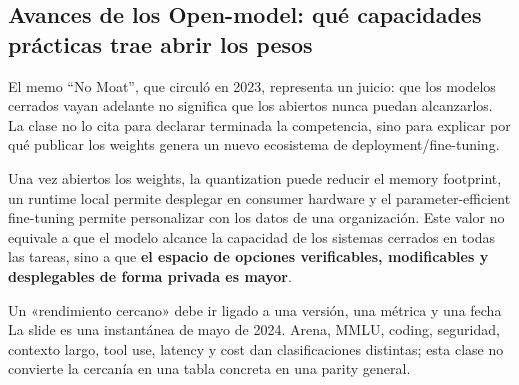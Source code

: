 
\subsection{Avances de los Open-model: qué capacidades prácticas trae abrir los pesos}

El memo ``No Moat'', que circuló en 2023, representa un juicio: que los modelos cerrados vayan adelante no significa que los abiertos nunca puedan alcanzarlos. La clase no lo cita para declarar terminada la competencia, sino para explicar por qué publicar los weights genera un nuevo ecosistema de deployment/fine-tuning.


Una vez abiertos los weights, la quantization puede reducir el memory footprint, un runtime local permite desplegar en consumer hardware y el parameter-efficient fine-tuning permite personalizar con los datos de una organización. Este valor no equivale a que el modelo alcance la capacidad de los sistemas cerrados en todas las tareas, sino a que \textbf{el espacio de opciones verificables, modificables y desplegables de forma privada es mayor}.


\begin{warningbox}{Un «rendimiento cercano» debe ir ligado a una versión, una métrica y una fecha}
La slide es una instantánea de mayo de 2024. Arena, MMLU, coding, seguridad, contexto largo, tool use, latency y cost dan clasificaciones distintas; esta clase no convierte la cercanía en una tabla concreta en una parity general.
\end{warningbox}


